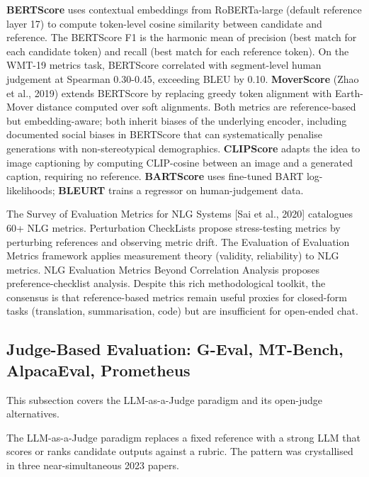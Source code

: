 \documentclass{article}
\begin{document}
\textbf{BERTScore} \cite{zhang2020bertscoreevaluatin} uses contextual embeddings from RoBERTa-large (default reference layer 17) to compute token-level cosine similarity between candidate and reference. The BERTScore F1 is the harmonic mean of precision (best match for each candidate token) and recall (best match for each reference token). On the WMT-19 metrics task, BERTScore correlated with segment-level human judgement at Spearman 0.30-0.45, exceeding BLEU by 0.10. \textbf{MoverScore} (Zhao et al., 2019) extends BERTScore by replacing greedy token alignment with Earth-Mover distance computed over soft alignments. Both metrics are reference-based but embedding-aware; both inherit biases of the underlying encoder, including documented social biases in BERTScore \cite{sun20222022} that can systematically penalise generations with non-stereotypical demographics. \textbf{CLIPScore} \cite{hessel20212021} adapts the idea to image captioning by computing CLIP-cosine between an image and a generated caption, requiring no reference. \textbf{BARTScore} uses fine-tuned BART log-likelihoods; \textbf{BLEURT} trains a regressor on human-judgement data.

The Survey of Evaluation Metrics for NLG Systems {[}Sai et al., 2020{]} catalogues 60+ NLG metrics. Perturbation CheckLists \cite{sai20212021} propose stress-testing metrics by perturbing references and observing metric drift. The Evaluation of Evaluation Metrics framework \cite{xiao20232023} applies measurement theory (validity, reliability) to NLG metrics. NLG Evaluation Metrics Beyond Correlation Analysis \cite{nimah20232023} proposes preference-checklist analysis. Despite this rich methodological toolkit, the consensus is that reference-based metrics remain useful proxies for closed-form tasks (translation, summarisation, code) but are insufficient for open-ended chat.

\subsection{Judge-Based Evaluation: G-Eval, MT-Bench, AlpacaEval, Prometheus}\label{judge-based-evaluation-g-eval-mt-bench-alpacaeval-prometheus}

This subsection covers the LLM-as-a-Judge paradigm and its open-judge alternatives.

The LLM-as-a-Judge paradigm replaces a fixed reference with a strong LLM that scores or ranks candidate outputs against a rubric. The pattern was crystallised in three near-simultaneous 2023 papers.
\end{document}
